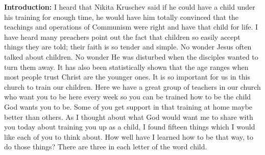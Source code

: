 \textbf{Introduction: }I heard that Nikita Kruschev said if he could have a child under his training for enough time, he would have him totally convinced that the teachings and operations of Communism were right and have that child for life.  I have heard many preachers point out the fact that children so easily accept things they are told; their faith is so tender and simple.  No wonder Jesus often talked about children.  No wonder He was disturbed when the disciples wanted to turn them away.  It has also been statistically shown that the age ranges when most people trust Christ are the younger ones.
 It is so important for us in this church to train our children.  Here we have a great group of teachers in our church who want you to be here every week so you can be trained how to be the child God wants you to be.  Some of you get support in that training at home maybe better than others.  As I thought about what God would want me to share with you today about training you up as a child, I found fifteen things which I would like each of you to think about.  How well have I learned how to be that way, to do those things?  There are three in each letter of the word child. \\
\\
